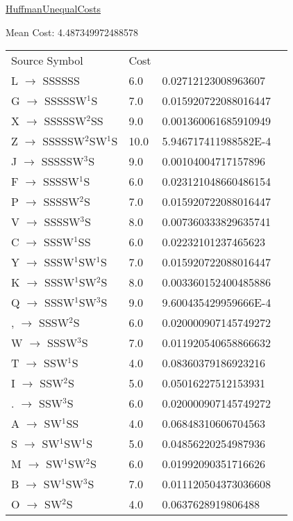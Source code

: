 \documentclass[12pt]{article}
\begin{document}
\noindent \url{HuffmanUnequalCosts}



\newpage
\noindent
\noindent Mean Cost: 4.487349972488578\\
\begin{tabular}{l l l l}
Source Symbol	&	Cost\\
L $\rightarrow$ SSSSSS	&	6.0	&	0.02712123008963607\\
G $\rightarrow$ SSSSSW{$^{1}$}S	&	7.0	&	0.015920722088016447\\
X $\rightarrow$ SSSSSW{$^{2}$}SS	&	9.0	&	0.001360061685910949\\
Z $\rightarrow$ SSSSSW{$^{2}$}SW{$^{1}$}S	&	10.0	&	5.946717411988582E-4\\
J $\rightarrow$ SSSSSW{$^{3}$}S	&	9.0	&	0.00104004717157896\\
F $\rightarrow$ SSSSW{$^{1}$}S	&	6.0	&	0.023121048660486154\\
P $\rightarrow$ SSSSW{$^{2}$}S	&	7.0	&	0.015920722088016447\\
V $\rightarrow$ SSSSW{$^{3}$}S	&	8.0	&	0.007360333829635741\\
C $\rightarrow$ SSSW{$^{1}$}SS	&	6.0	&	0.02232101237465623\\
Y $\rightarrow$ SSSW{$^{1}$}SW{$^{1}$}S	&	7.0	&	0.015920722088016447\\
K $\rightarrow$ SSSW{$^{1}$}SW{$^{2}$}S	&	8.0	&	0.003360152400485886\\
Q $\rightarrow$ SSSW{$^{1}$}SW{$^{3}$}S	&	9.0	&	9.600435429959666E-4\\
, $\rightarrow$ SSSW{$^{2}$}S	&	6.0	&	0.020000907145749272\\
W $\rightarrow$ SSSW{$^{3}$}S	&	7.0	&	0.011920540658866632\\
T $\rightarrow$ SSW{$^{1}$}S	&	4.0	&	0.08360379186923216\\
I $\rightarrow$ SSW{$^{2}$}S	&	5.0	&	0.05016227512153931\\
. $\rightarrow$ SSW{$^{3}$}S	&	6.0	&	0.020000907145749272\\
A $\rightarrow$ SW{$^{1}$}SS	&	4.0	&	0.06848310606704563\\
S $\rightarrow$ SW{$^{1}$}SW{$^{1}$}S	&	5.0	&	0.04856220254987936\\
M $\rightarrow$ SW{$^{1}$}SW{$^{2}$}S	&	6.0	&	0.01992090351716626\\
B $\rightarrow$ SW{$^{1}$}SW{$^{3}$}S	&	7.0	&	0.011120504373036608\\
O $\rightarrow$ SW{$^{2}$}S	&	4.0	&	0.0637628919806488\\

\end{tabular}
\end{document}
